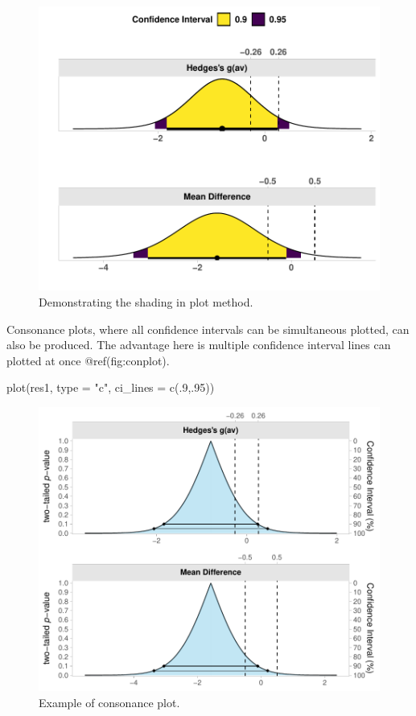 \documentclass[]{interact}
\theoremstyle{plain}%
\theoremstyle{definition}
\theoremstyle{remark}
\newenvironment{Shaded}{\begin{snugshade}}{\end{snugshade}}
\newcommand{\AttributeTok}[1]{\textcolor[rgb]{0.77,0.63,0.00}{#1}}
\newcommand{\DecValTok}[1]{\textcolor[rgb]{0.00,0.00,0.81}{#1}}
\newcommand{\FunctionTok}[1]{\textcolor[rgb]{0.00,0.00,0.00}{#1}}
\newcommand{\NormalTok}[1]{#1}
\newcommand{\StringTok}[1]{\textcolor[rgb]{0.31,0.60,0.02}{#1}}
\begin{document}
\begin{figure}
\centering
\includegraphics{Avocado_Update_files/figure-latex/shadeplot-1.pdf}
\caption{Demonstrating the shading in plot method.}
\end{figure}

\newpage

Consonance plots, where all confidence intervals can be simultaneous
plotted, can also be produced. The advantage here is multiple confidence
interval lines can plotted at once @ref(fig:conplot).

\begin{Shaded}
\begin{Highlighting}[]
\FunctionTok{plot}\NormalTok{(res1, }\AttributeTok{type =} \StringTok{"c"}\NormalTok{,}
     \AttributeTok{ci\_lines =}  \FunctionTok{c}\NormalTok{(.}\DecValTok{9}\NormalTok{,.}\DecValTok{95}\NormalTok{))}
\end{Highlighting}
\end{Shaded}

\begin{figure}
\centering
\includegraphics{Avocado_Update_files/figure-latex/conplot-1.pdf}
\caption{Example of consonance plot.}
\end{figure}
\end{document}

